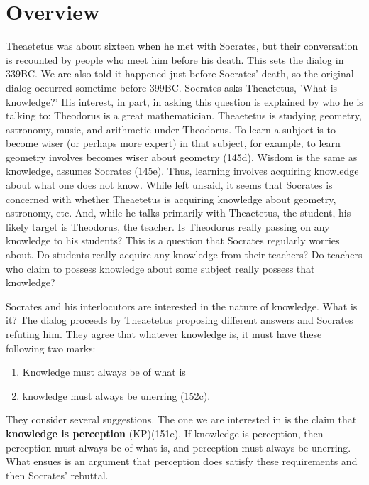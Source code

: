 \documentclass[oneside]{article}
\begin{document}
\section*{Overview}

Theaetetus was about sixteen when he met with Socrates, but their conversation is recounted by people who meet him before his death. This sets the dialog in 339BC. We are also told it happened just before Socrates' death, so the original dialog occurred sometime before 399BC. Socrates asks Theaetetus, 'What is knowledge?' His interest, in part, in asking this question is explained by who he is talking to: Theodorus is a great mathematician. Theaetetus is studying geometry, astronomy, music, and arithmetic under Theodorus. To learn a subject is to become wiser (or perhaps more expert) in that subject, for example, to learn geometry involves becomes wiser about geometry (145d). Wisdom is the same as knowledge, assumes Socrates (145e). Thus, learning involves acquiring knowledge about what one does not know. While left unsaid, it seems that Socrates is concerned with whether Theaetetus is acquiring knowledge about geometry, astronomy, etc. And, while he talks primarily with Theaetetus, the student, his likely target is Theodorus, the teacher. Is Theodorus really passing on any knowledge to his students? This is a question that Socrates regularly worries about. Do students really acquire any knowledge from their teachers? Do teachers who claim to possess knowledge about some subject really possess that knowledge? 


Socrates and his interlocutors are interested in the nature of knowledge. What is it? The dialog proceeds by Theaetetus proposing different answers and Socrates refuting him. They agree that whatever knowledge is, it must have these following two marks: 
\begin{enumerate}
\item Knowledge must always be of what is
\item knowledge must always be unerring (152c).
\end{enumerate}

They consider several suggestions. The one we are interested in is the claim that \textbf{knowledge is perception} (KP)(151e). If knowledge is perception, then perception must always be of what is, and perception must always be unerring. What ensues is an argument that perception does satisfy these requirements and then Socrates' rebuttal. 
\end{document}
